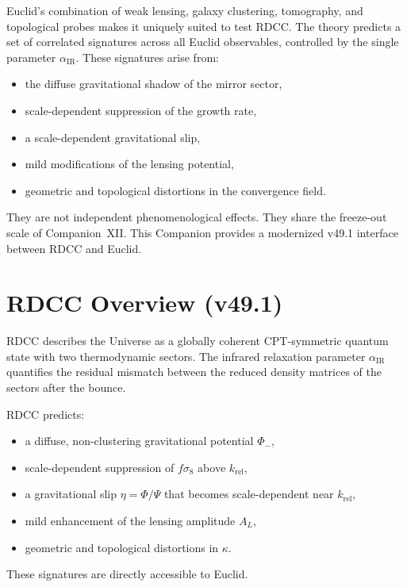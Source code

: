 \documentclass[11pt,a4paper]{article}
\begin{document}
Euclid's combination of weak lensing, galaxy clustering, tomography, and
topological probes makes it uniquely suited to test RDCC. The theory predicts
a set of correlated signatures across all Euclid observables, controlled by the
single parameter \(\alpha_{\mathrm{IR}}\). These signatures arise from:
\begin{itemize}
  \item the diffuse gravitational shadow of the mirror sector,
  \item scale-dependent suppression of the growth rate,
  \item a scale-dependent gravitational slip,
  \item mild modifications of the lensing potential,
  \item geometric and topological distortions in the convergence field.
\end{itemize}
They are not independent phenomenological effects. They share the freeze-out
scale of Companion~XII. This Companion provides a modernized v49.1 interface
between RDCC and Euclid.


\section{RDCC Overview (v49.1)}

RDCC describes the Universe as a globally coherent CPT-symmetric quantum state
with two thermodynamic sectors. The infrared relaxation parameter
\(\alpha_{\mathrm{IR}}\) quantifies the residual mismatch between the reduced
density matrices of the sectors after the bounce.

RDCC predicts:
\begin{itemize}
  \item a diffuse, non-clustering gravitational potential \(\Phi_{-}\),
  \item scale-dependent suppression of \(f\sigma_8\) above \(k_{\mathrm{rel}}\),
  \item a gravitational slip \(\eta=\Phi/\Psi\) that becomes scale-dependent
        near \(k_{\mathrm{rel}}\),
  \item mild enhancement of the lensing amplitude \(A_L\),
  \item geometric and topological distortions in \(\kappa\).
\end{itemize}
These signatures are directly accessible to Euclid.
\end{document}
